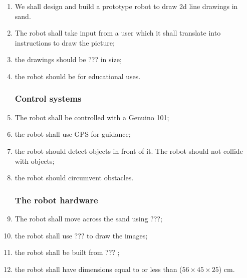     \label{outline specification}
        \begin{enumerate} %
            \subsubsection{The project}
            \item We shall design and build a prototype robot to draw 2d line drawings in sand.\label{spec: draw}
            \item The robot shall take input from a user which it shall translate into instructions to draw the picture;\label{spec: take input}
            \item the drawings should be ???  in size; \label{spec: drawing size}
            \item the robot should be for educational uses. \label{spec: education}

            \subsubsection{Control systems}
            \item The robot shall be controlled with a \gls{Genuino} 101; \label{spec: arduino}
            \item the robot shall use \gls{GPS} for guidance; \label{spec: gps}
            \item the robot should detect objects in front of it. The robot should not collide with objects; \label{spec: detect objects}
            \item the robot should circumvent obstacles.\label{spec: circumvent}

            \subsubsection{The robot hardware}
            \item The robot shall move across the sand using ???; \label{spec: movement}
            \item the robot shall use ???  to draw the images; \label{spec: tool}
            \item the robot shall be built from ??? ; \label{spec: material}
            \item the robot shall have dimensions equal to or less than ($56 \times 45 \times 25$) cm. \label{spec: robot size}


\end{enumerate}
